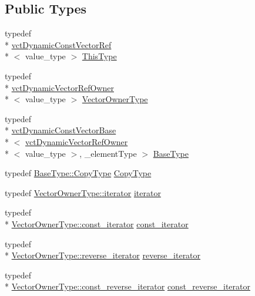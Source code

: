 \subsection*{Public Types}
\begin{DoxyCompactItemize}
\item 
typedef \\*
\hyperlink{classvct_dynamic_const_vector_ref}{vct\-Dynamic\-Const\-Vector\-Ref}\\*
$<$ value\-\_\-type $>$ \hyperlink{classvct_dynamic_const_vector_ref_a8da0588e2e355e6224badfd42845195e}{This\-Type}
\item 
typedef \\*
\hyperlink{classvct_dynamic_vector_ref_owner}{vct\-Dynamic\-Vector\-Ref\-Owner}\\*
$<$ value\-\_\-type $>$ \hyperlink{classvct_dynamic_const_vector_ref_a3399abece6e1a8d528f82fa8148a751d}{Vector\-Owner\-Type}
\item 
typedef \\*
\hyperlink{classvct_dynamic_const_vector_base}{vct\-Dynamic\-Const\-Vector\-Base}\\*
$<$ \hyperlink{classvct_dynamic_vector_ref_owner}{vct\-Dynamic\-Vector\-Ref\-Owner}\\*
$<$ value\-\_\-type $>$, \-\_\-element\-Type $>$ \hyperlink{classvct_dynamic_const_vector_ref_aba5f5c67feb404f0cf15c0f205625fec}{Base\-Type}
\item 
typedef \hyperlink{classvct_dynamic_const_vector_base_a010ba1a93ccebf494be5a188f923eb43}{Base\-Type\-::\-Copy\-Type} \hyperlink{classvct_dynamic_const_vector_ref_a32b6a671d547b46f2f972fea2352579a}{Copy\-Type}
\item 
typedef \hyperlink{classvct_dynamic_vector_ref_owner_aaee0b96d24843f333909f2aba3aad782}{Vector\-Owner\-Type\-::iterator} \hyperlink{classvct_dynamic_const_vector_ref_ac4d0cbe331233df2f11b5a51d665006f}{iterator}
\item 
typedef \\*
\hyperlink{classvct_dynamic_vector_ref_owner_a4f7a05e13925c0eeb1d5c754c3193ba0}{Vector\-Owner\-Type\-::const\-\_\-iterator} \hyperlink{classvct_dynamic_const_vector_ref_a745d586c746244f3326ca5a07c73dea5}{const\-\_\-iterator}
\item 
typedef \\*
\hyperlink{classvct_dynamic_vector_ref_owner_a3949acd3baa131459d464b058d249990}{Vector\-Owner\-Type\-::reverse\-\_\-iterator} \hyperlink{classvct_dynamic_const_vector_ref_a0f78f6ce35765714ea4dc8c182c6dc73}{reverse\-\_\-iterator}
\item 
typedef \\*
\hyperlink{classvct_dynamic_vector_ref_owner_a9ab3900ecbd8f4d4eb4615a2c9a972a3}{Vector\-Owner\-Type\-::const\-\_\-reverse\-\_\-iterator} \hyperlink{classvct_dynamic_const_vector_ref_af3fefcebbdfdf747813c57272961cd9d}{const\-\_\-reverse\-\_\-iterator}
\end{DoxyCompactItemize}
